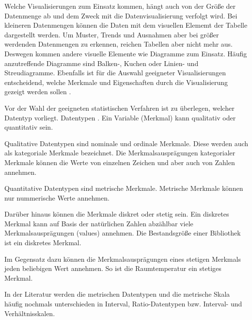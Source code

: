 Welche Visualisierungen zum Einsatz kommen, hängt auch von der Größe der Datenmenge ab und dem Zweck mit die Datenvisualisierung verfolgt wird.
Bei kleineren Datenmengen können die Daten mit dem visuellen Elememt der Tabelle dargestellt werden.
Um Muster, Trends und Ausnahmen aber bei größer werdenden Datenmengen zu erkennen, reichen Tabellen aber nicht mehr aus. Deswegen
kommen andere visuelle Elemente wie Diagramme zum Einsatz. Häufig anzutreffende Diagramme sind Balken-, Kuchen oder Linien- und Streudiagramme.
Ebenfalls ist für die Auswahl geeigneter Visualisierungen entscheidend, welche Merkmale und Eigenschaften durch die Visualisierung gezeigt werden sollen \cite[Vgl.][17]{kirk_data_2019}.



\clearpage

Vor der Wahl der geeigneten statistischen Verfahren ist zu überlegen, welcher Datentyp vorliegt.
Datentypen  \cite[99]{kirk_data_2019}.
Ein Variable (Merkmal) kann qualitativ oder quantitativ sein.

Qualitative Datentypen sind nominale und ordinale Merkmale. Diese werden auch als kategoriale Merkmale bezeichnet.
Die Merkmalsausprägungen kategorialer Merkmale können die Werte von einzelnen Zeichen und aber auch von Zahlen annehmen.

Quantitative Datentypen sind metrische Merkmale. Metrische Merkmale können nur nummerische Werte annehmen.

Darüber hinaus können die Merkmale diskret oder stetig sein. Ein diskretes Merkmal kann auf Basis der natürlichen Zahlen abzählbar viele Merkmalsausprägungen (values) annehmen. Die Bestandsgröße einer
Bibliothek ist ein diskretes Merkmal. 

Im Gegensatz dazu können die Merkmalsausprägungen eines stetigen Merkmals jeden beliebigen Wert annehmen. 
So ist die Raumtemperatur ein stetiges Merkmal.

 In der Literatur werden die metrischen Datentypen und die metrische Skala häufig nochmals unterschieden
in Interval, Ratio-Datentypen \cite[Vgl.][100 f.]{kirk_data_2019} bzw. Interval- und Verhältnisskalen\cite[Vgl.][13 ff.]{bortz_statistik_2010}.

